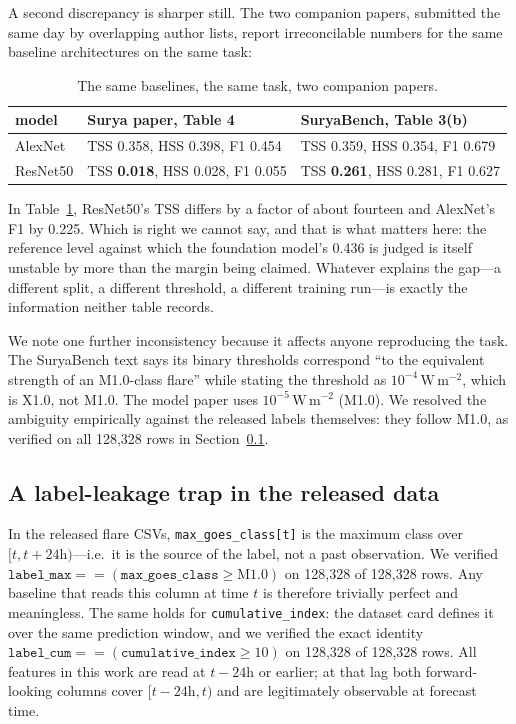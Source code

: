 \documentclass[11pt]{article}
\newcommand{\Wm}{\,\mathrm{W\,m^{-2}}}
\newcommand{\code}[1]{\texttt{#1}}
\begin{document}
A second discrepancy is sharper still. The two companion papers, submitted the
same day by overlapping author lists, report irreconcilable numbers for the same
baseline architectures on the same task:

\begin{table}[htbp]
\centering
\caption{The same baselines, the same task, two companion papers.}
\label{tab:baselinegap}
\begin{tabular}{lll}
\toprule
model & Surya paper, Table 4 & SuryaBench, Table 3(b) \\
\midrule
AlexNet & TSS 0.358, HSS 0.398, F1 0.454 & TSS 0.359, HSS 0.354, F1 0.679 \\
ResNet50 & TSS \textbf{0.018}, HSS 0.028, F1 0.055 & TSS \textbf{0.261}, HSS 0.281, F1 0.627 \\
\bottomrule
\end{tabular}
\end{table}

In Table~\ref{tab:baselinegap}, ResNet50's TSS differs by a factor of about
fourteen and AlexNet's F1 by 0.225.
Which is right we cannot say, and that is what matters here: the reference level
against which the foundation model's 0.436 is judged is itself unstable by more
than the margin being claimed. Whatever explains the gap---a different split, a different
threshold, a different training run---is exactly the information neither table
records.

We note one further inconsistency because it affects anyone reproducing the task.
The SuryaBench text says its binary thresholds correspond ``to the equivalent
strength of an M1.0-class flare'' while stating the threshold as $10^{-4}\Wm$,
which is X1.0, not M1.0. The model paper uses $10^{-5}\Wm$ (M1.0). We resolved
the ambiguity empirically against the released labels themselves: they follow
M1.0, as verified on all 128{,}328 rows in Section~\ref{sec:leak}.

\subsection{A label-leakage trap in the released data}
\label{sec:leak}

In the released flare CSVs, \code{max\_goes\_class[t]} is the maximum class over
$[t, t+24\mathrm{h})$---i.e.\ it is the source of the label, not a past
observation. We verified
$\code{label\_max} == (\code{max\_goes\_class} \geq \mathrm{M1.0})$
on 128{,}328 of 128{,}328 rows. Any baseline that reads this column at time $t$
is therefore trivially perfect and meaningless. The same holds for
\code{cumulative\_index}: the dataset card defines it over the same prediction
window, and we verified the exact identity
$\code{label\_cum} == (\code{cumulative\_index} \geq 10)$ on 128{,}328 of
128{,}328 rows. All features in this work are read at $t-24$h or earlier; at
that lag both forward-looking columns cover $[t-24\mathrm{h}, t)$ and are
legitimately observable at forecast time.
\end{document}
